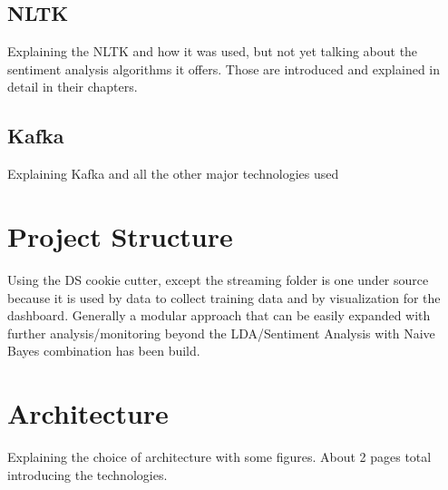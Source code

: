 \subsection{NLTK}
\label{subsec:nltk}

Explaining the NLTK and how it was used, but not yet talking about the sentiment analysis algorithms it offers.
Those are introduced and explained in detail in their chapters.

\subsection{Kafka}
\label{subsec:kafka}

Explaining Kafka and all the other major technologies used

\section{Project Structure}
\label{sec:projectStructure}


Using the DS cookie cutter, except the streaming folder is one under source because it is used by data to collect training data and by visualization for the dashboard.
Generally a modular approach that can be easily expanded with further analysis/monitoring beyond the LDA/Sentiment Analysis with Naive Bayes combination has been build.


\section{Architecture}
\label{sec:architecture}

Explaining the choice of architecture with some figures.
About 2 pages total introducing the technologies.

\pagebreak[2]